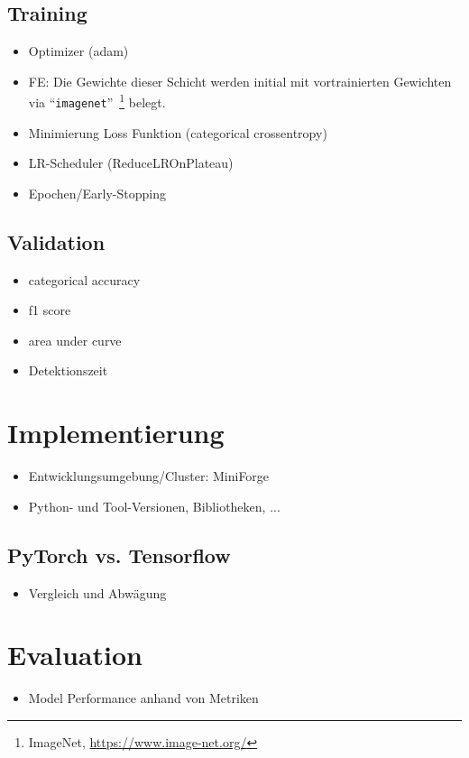 \documentclass{article}
\begin{document}
    \subsection{Training}
    \begin{itemize}
        \item Optimizer (adam)
        \item FE: Die Gewichte dieser Schicht werden initial mit vortrainierten Gewichten via \enquote{\texttt{imagenet}}~\footnote{ImageNet, \url{https://www.image-net.org/}} belegt.
        \item Minimierung Loss Funktion (categorical crossentropy)
        \item LR-Scheduler (ReduceLROnPlateau)
        \item Epochen/Early-Stopping
    \end{itemize}
    \subsection{Validation}
    \begin{itemize}
        \item categorical accuracy
        \item f1 score
        \item area under curve
        \item Detektionszeit
    \end{itemize}

    \section{Implementierung}
    \begin{itemize}
        \item Entwicklungsumgebung/Cluster: MiniForge
        \item Python- und Tool-Versionen, Bibliotheken, ... %
    \end{itemize}
    \subsection{PyTorch vs. Tensorflow}
    \begin{itemize}
        \item Vergleich und Abwägung
    \end{itemize}
    \section{Evaluation}
    \begin{itemize}
        \item Model Performance anhand von Metriken
    \end{itemize}
\end{document}
